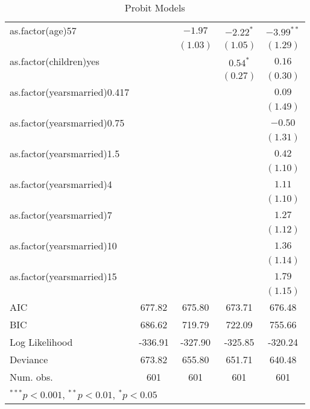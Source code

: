 \begin{table}[hb!]
\begin{center}
\begin{tabular}{l c c c c }
as.factor(age)57             &               & $-1.97$     & $-2.22^{*}$ & $-3.99^{**}$ \\
                             &               & $(1.03)$    & $(1.05)$    & $(1.29)$     \\
as.factor(children)yes       &               &             & $0.54^{*}$  & $0.16$       \\
                             &               &             & $(0.27)$    & $(0.30)$     \\
as.factor(yearsmarried)0.417 &               &             &             & $0.09$       \\
                             &               &             &             & $(1.49)$     \\
as.factor(yearsmarried)0.75  &               &             &             & $-0.50$      \\
                             &               &             &             & $(1.31)$     \\
as.factor(yearsmarried)1.5   &               &             &             & $0.42$       \\
                             &               &             &             & $(1.10)$     \\
as.factor(yearsmarried)4     &               &             &             & $1.11$       \\
                             &               &             &             & $(1.10)$     \\
as.factor(yearsmarried)7     &               &             &             & $1.27$       \\
                             &               &             &             & $(1.12)$     \\
as.factor(yearsmarried)10    &               &             &             & $1.36$       \\
                             &               &             &             & $(1.14)$     \\
as.factor(yearsmarried)15    &               &             &             & $1.79$       \\
                             &               &             &             & $(1.15)$     \\
\midrule
AIC                          & 677.82        & 675.80      & 673.71      & 676.48       \\
BIC                          & 686.62        & 719.79      & 722.09      & 755.66       \\
Log Likelihood               & -336.91       & -327.90     & -325.85     & -320.24      \\
Deviance                     & 673.82        & 655.80      & 651.71      & 640.48       \\
Num. obs.                    & 601           & 601         & 601         & 601          \\
\bottomrule
\multicolumn{5}{l}{\scriptsize{$^{***}p<0.001$, $^{**}p<0.01$, $^*p<0.05$}}
\end{tabular}
\caption{Probit Models}
\label{table:coefficients}
\end{center}
\end{table}
